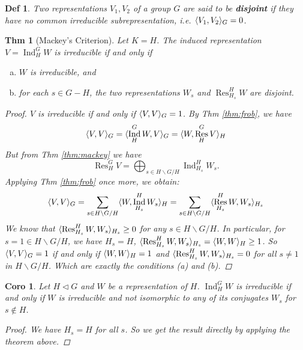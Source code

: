 \documentclass[a4paper]{article}
\DeclarePairedDelimiter{\inpd}{\langle}{\rangle} %
\DeclareMathOperator{\Res}{Res}
\DeclareMathOperator{\Ind}{Ind}
\newcommand*\bsl{\backslash}
\theoremstyle{mystyle}
\newtheorem{theorem}{Thm}
\newtheorem{definition}{Def}
\newtheorem{coro}{Coro}
\begin{document}
\begin{definition}
  Two representations $V_1, V_2$ of a group $G$ are said to be {\bf disjoint}
  if they have no common irreducible subrepresentation, i.e.
  $\inpd{V_1, V_2}_G = 0$.
\end{definition}

\begin{theorem}[Mackey's Criterion]
  Let $K = H$. The induced representation $V = \Ind^G_H W$ is irreducible
  if and only if
  \begin{enumerate}[(a)]
    \item $W$ is irreducible, and
    \item for each $s\in G - H$, the two representations $W_s$
      and $\Res^H_{H_s} W$ are disjoint.
  \end{enumerate}
  \begin{proof}
    $V$ is irreducible if and only if $\inpd{V, V}_G = 1$.
    By Thm \ref{thm:frob}, we have
    \[ \inpd{V, V}_G = \inpd{\Ind^G_H W, V}_G = \inpd{W, \Res^G_H V}_H \]
    But from Thm \ref{thm:mackey} we have
    \[ \Res^G_H V = \bigoplus_{s\in H\bsl G/H} \Ind^H_{H_s} W_s. \]
    Applying Thm \ref{thm:frob} once more, we obtain:
    \[ \inpd{V, V}_G = \sum_{s\in H\bsl G/H} \inpd{W, \Ind^H_{H_s} W_s}_H
      = \sum_{s\in H\bsl G/H} \inpd{\Res^H_{H_s} W, W_s}_{H_s}
    \]
    We know that $\inpd{\Res^H_{H_s} W, W_s}_{H_s} \ge 0$ for any
    $s\in H\bsl G/H$.
    In particular, for $s = 1 \in H\bsl G/H$, we have $H_s = H$,
    $\inpd{\Res^H_{H_s} W, W_s}_{H_s} = \inpd{W, W}_H \ge 1$.
    So $\inpd{V, V}_G = 1$ if and only if
    $\inpd{W, W}_H = 1$ and $\inpd{\Res^H_{H_s} W, W_s}_{H_s} = 0$
    for all $s\ne 1$ in $H\bsl G/H$.
    Which are exactly the conditions (a) and (b).
  \end{proof}
\end{theorem}

\begin{coro}
  Let $H \lhd G$ and $W$ be a representation of $H$. $\Ind^G_H W$ is
  irreducible if and only if $W$ is irreducible and not isomorphic to
  any of its conjugates $W_s$ for $s \not\in H$.
  \begin{proof}
    We have $H_s = H$ for all $s$. So we get the result directly by
    applying the theorem above.
  \end{proof}
\end{coro}
% 
% 
\end{document}
